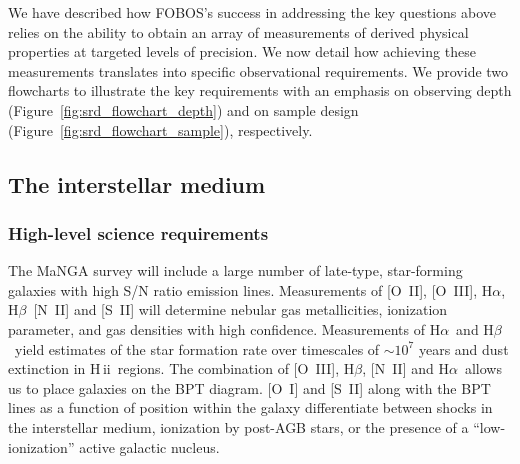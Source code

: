 \documentclass[preprint,11pt]{aastex}
\newcommand{\Halpha}{{H$\alpha$}}
\newcommand{\Hbeta}{{H$\beta$}}
\newcommand{\HII}{{\sc H\,ii}}
\begin{document}

We have described how FOBOS's success in addressing the key questions
above relies on the ability to obtain an array of measurements of
derived physical properties at targeted levels of precision.  We now
detail how achieving these measurements translates into specific
observational requirements. We provide two flowcharts
to illustrate the key requirements with an emphasis on observing depth
(Figure~\ref{fig:srd_flowchart_depth}) and on sample design
(Figure~\ref{fig:srd_flowchart_sample}), respectively.

\subsection{The interstellar medium}\label{sec:reqirements_ism}

\subsubsection{High-level science requirements}

The MaNGA survey will include a large number of late-type,
star-forming galaxies with high S/N ratio emission lines.
Measurements of [O~II], [O~III], \Halpha, \Hbeta\, [N~II] and [S~II]
will determine nebular gas metallicities, ionization parameter, and
gas densities with high confidence. Measurements of \Halpha\ and
\Hbeta\ yield estimates of the star formation rate over timescales of
$\sim$$10^7$ years and dust extinction in \HII\ regions.  The
combination of [O~III], \Hbeta, [N~II] and \Halpha\ allows us to place
galaxies on the BPT diagram. [O~I] and [S~II] along with the BPT lines
as a function of position within the galaxy differentiate between
shocks in the interstellar medium, ionization by post-AGB stars, or
the presence of a ``low-ionization'' active galactic nucleus.
\end{document}
